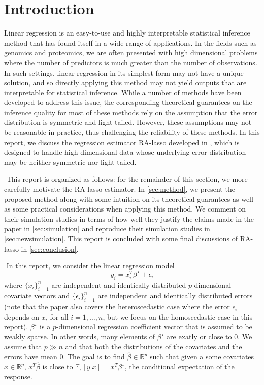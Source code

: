 

\section{Introduction}
Linear regression is an easy-to-use and highly interpretable statistical inference method that has found itself in a wide range of applications. In the fields such as genomics and proteomics, we are often presented with high dimensional problems where the number of predictors is much greater than the number of observations. In such settings, linear regression in its simplest form may not have a unique solution, and so directly applying this method may not yield outputs that are interpretable for statistical inference. While a number of methods have been developed to address this issue, the corresponding theoretical guarantees on the inference quality for most of these methods rely on the assumption that the error distribution is symmetric and light-tailed. However, these assumptions may not be reasonable in practice, thus challenging the reliability of these methods. In this report, we discuss the regression estimator RA-lasso developed in \citet{fan2017estimation}, which is designed to handle high dimensional data whose underlying error distribution may be neither symmetric nor light-tailed.

$ $\newline
This report is organized as follows: for the remainder of this section, we more carefully motivate the RA-lasso estimator. In \cref{sec:method}, we present the proposed method along with some intuition on its theoretical guarantees as well as some practical considerations when applying this method. We comment on their simulation studies in terms of how well they justify the claims made in the paper in \cref{sec:simulation} and reproduce their simulation studies in \cref{sec:newsimulation}. This report is concluded with some final discussions of RA-lasso in \cref{sec:conclusion}.

$ $\newline
In this report, we consider the linear regression model
\[
y_i = x_i^T\beta^\star + \epsilon_i
\]
where $\{x_i\}_{i=1}^n$ are independent and identically distributed $p$-dimensional covariate vectors and $\{\epsilon_i\}_{i=1}^n$ are independent and identically distributed errors (note that the paper also covers the heteroscedastic case where the error $\epsilon_i$ depends on $x_i$ for all $i=1,\dots,n$, but we focus on the homoscedastic case in this report). $\beta^\star$ is a $p$-dimensional regression coefficient vector that is assumed to be weakly sparse. In other words, many elements of $\beta^\star$ are exatly or close to $0$. We assume that $p \gg n$ and that both the distributions of the covariates and the errors have mean $0$. The goal is to find $\hat{\beta}\in\mathbb{R}^p$ such that given a some covariates $x\in\mathbb{R}^p$, $x^T\hat{\beta}$ is close to $\mathbb{E}_{\epsilon}\left[ y | x \right] = x^T\beta^\star$, the conditional expectation of the response.

